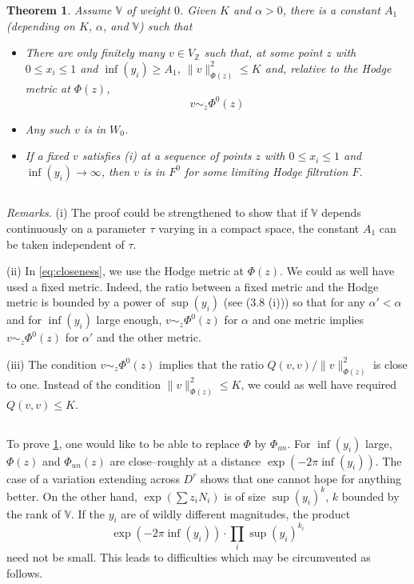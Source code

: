 \documentclass[11pt,a4paper]{article}
\theoremstyle{plain}
\newtheorem{theorem}{Theorem}[section]
\theoremstyle{definition}
\begin{document}
\begin{theorem}\label{thm:closeness}
Assume $\mathbb{V}$ of weight $0$. Given $K$ and $\alpha>0$, there is a constant $A_1$ (depending on $K$, $\alpha$, and $\mathbb{V}$) such that
\begin{itemize}
\item[(i)] There are only finitely many $v\in V_{\mathbb{Z}}$ such that, at some point $z$ with $0\leq x_i\leq 1$ and $\inf(y_i)\geq A_1$, $\|v\|_{\Phi(z)}^2\leq K$ and, relative to the Hodge metric at $\Phi(z)$,
\begin{equation}\label{eq:closeness}
v\sim_z\Phi^0(z)
\end{equation}
\item[(ii)] Any such $v$ is in $W_0$.
\item[(iii)] If a fixed $v$ satisfies (i) at a sequence of points $z$ with $0\leq x_i\leq 1$ and $\inf(y_i)\to\infty$, then $v$ is in $F^0$ for some limiting Hodge filtration $F$.
\end{itemize}
\end{theorem}

\subsection{}
\textit{Remarks.} (i) The proof could be strengthened to show that if $\mathbb{V}$ depends continuously on a parameter $\tau$ varying in a compact space, the constant $A_1$ can be taken independent of $\tau$.

(ii) In \eqref{eq:closeness}, we use the Hodge metric at $\Phi(z)$. We could as well have used a fixed metric. Indeed, the ratio between a fixed metric and the Hodge metric is bounded by a power of $\sup(y_i)$ (see (3.8 (i))) so that for any $\alpha'<\alpha$ and for $\inf(y_i)$ large enough, $v\sim_z\Phi^0(z)$ for $\alpha$ and one metric implies $v\sim_z\Phi^0(z)$ for $\alpha'$ and the other metric.

(iii) The condition $v\sim_z\Phi^0(z)$ implies that the ratio $Q(v,v)/\|v\|_{\Phi(z)}^2$ is close to one. Instead of the condition $\|v\|_{\Phi(z)}^2\leq K$, we could as well have required $Q(v,v)\leq K$.

\subsection{}
To prove \ref{thm:closeness}, one would like to be able to replace $\Phi$ by $\Phi_{un}$. For $\inf(y_i)$ large, $\Phi(z)$ and $\Phi_{un}(z)$ are close--roughly at a distance $\exp(-2\pi\inf(y_i))$. The case of a variation extending across $D^r$ shows that one cannot hope for anything better. On the other hand, $\exp(\sum z_i N_i)$ is of size $\sup(y_i)^k$, $k$ bounded by the rank of $\mathbb{V}$. If the $y_i$ are of wildly different magnitudes, the product
\[
\exp(-2\pi\inf(y_i))\cdot\prod_i\sup(y_i)^{k_i}
\]
need not be small. This leads to difficulties which may be circumvented as follows.
\end{document}
